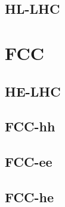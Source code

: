 
\subsection{HL-LHC}
\section{FCC}
\subsection{HE-LHC}
\subsection{FCC-hh}
\subsection{FCC-ee}
\subsection{FCC-he}
